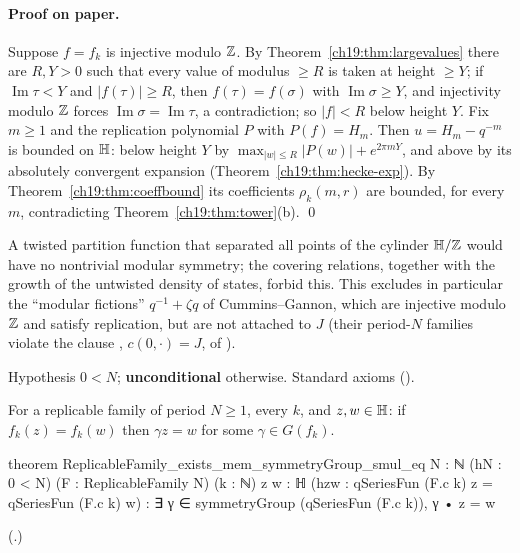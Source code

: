 \paragraph{Proof on paper.}  Suppose $f=f_k$ is injective modulo ${\mathbb{Z}}$.  By Theorem~\ref{ch19:thm:largevalues} there are $R,Y>0$ such
that every value of modulus $\ge R$ is taken at height $\ge Y$; if $\operatorname{Im}\tau<Y$ and $|f(\tau)|\ge R$, then $f(\tau)=f(\sigma)$ with
$\operatorname{Im}\sigma\ge Y$, and injectivity modulo ${\mathbb{Z}}$ forces $\operatorname{Im}\sigma=\operatorname{Im}\tau$, a contradiction; so $|f|<R$ below
height $Y$.  Fix $m\ge1$ and the replication polynomial $P$ with $P(f)=H_m$.  Then $u=H_m-q^{-m}$ is bounded on $\mathbb{H}$: below
height $Y$ by $\max_{|w|\le R}|P(w)|+e^{2\pi mY}$, and above by its absolutely convergent expansion (Theorem~\ref{ch19:thm:hecke-exp}).
By Theorem~\ref{ch19:thm:coeffbound} its coefficients $\rho_k(m,r)$ are bounded, for every $m$, contradicting
Theorem~\ref{ch19:thm:tower}(b). \qed
\begin{physics}A twisted partition function that separated all points of the cylinder $\mathbb{H}/{\mathbb{Z}}$ would have no
nontrivial modular symmetry; the covering relations, together with the growth of the untwisted density of states, forbid
this.  This excludes in particular the ``modular fictions'' $q^{-1}+\zeta q$ of Cummins--Gannon, which are injective modulo
${\mathbb{Z}}$ and satisfy replication, but are not attached to $J$ (their period-$N$ families violate the clause , $c(0,\cdot)=J$, of ).\end{physics}
\begin{status}Hypothesis $0<N$; \textbf{unconditional} otherwise.  Standard axioms
().\end{status}

\begin{theorem}\label{ch19:thm:propPLR}
For a replicable family of period $N\ge1$, every $k$, and $z,w\in\mathbb{H}$: if $f_k(z)=f_k(w)$ then $\gamma z=w$ for some $\gamma\in
G(f_k)$.
\end{theorem}
\begin{leancode}
theorem ReplicableFamily_exists_mem_symmetryGroup_smul_eq {N : ℕ} (hN : 0 < N)
    (F : ReplicableFamily N) (k : ℕ) {z w : ℍ}
    (hzw : qSeriesFun (F.c k) z = qSeriesFun (F.c k) w) :
    ∃ γ ∈ symmetryGroup (qSeriesFun (F.c k)), γ • z = w
\end{leancode}
(.)
